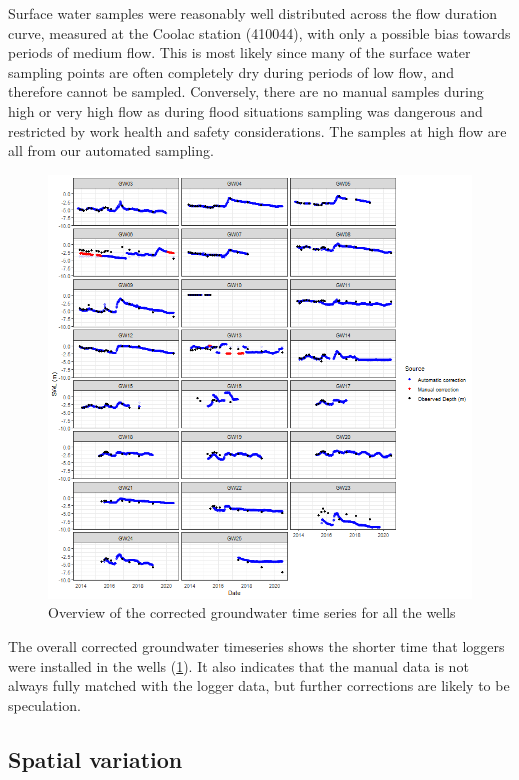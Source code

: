 \documentclass[, manuscript]{copernicus}
\begin{document}
\clearpage

Surface water samples were reasonably well distributed across the flow
duration curve, measured at the Coolac station (410044), with only a
possible bias towards periods of medium flow. This is most likely since
many of the surface water sampling points are often completely dry
during periods of low flow, and therefore cannot be sampled. Conversely,
there are no manual samples during high or very high flow as during
flood situations sampling was dangerous and restricted by work health
and safety considerations. The samples at high flow are all from our
automated sampling.

\begin{figure}
\includegraphics[width=1\linewidth]{Figures/Final_Corrected_piezodepths} \caption{Overview of the corrected groundwater time series for all the wells}\label{fig:gw-series}
\end{figure}

\clearpage

The overall corrected groundwater timeseries shows the shorter time that
loggers were installed in the wells (\ref{fig:gw-series}). It also
indicates that the manual data is not always fully matched with the
logger data, but further corrections are likely to be speculation.

\subsection{Spatial variation}
\end{document}
